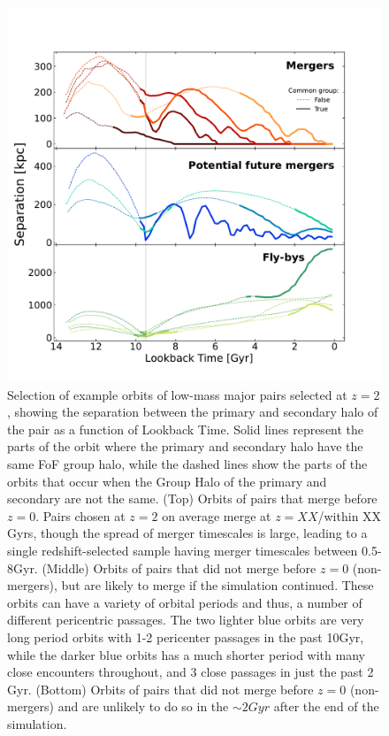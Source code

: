 \documentclass[twocolumn]{aastex631}
\begin{document}
\begin{figure}[htb]
    \centering
    \includegraphics[width=\textwidth]{plots/bet-on-it/exorbits_physical.pdf}
    \caption{Selection of example orbits of low-mass major pairs selected at $z=2$, showing the separation between the primary and secondary halo of the pair as a function of Lookback Time.
    Solid lines represent the parts of the orbit where the primary and secondary halo have the same FoF group halo, while the dashed lines show the parts of the orbits that occur when the Group Halo of the primary and secondary are not the same. 
    (Top) Orbits of pairs that merge before $z=0$. Pairs chosen at $z=2$ on average merge at $z=XX$/within XX Gyrs, though the spread of merger timescales is large, leading to a single redshift-selected sample having merger timescales between 0.5-8Gyr. 
    (Middle) Orbits of pairs that did not merge before $z=0$ (non-mergers), but are likely to merge if the simulation continued. These orbits can have a variety of orbital periods and thus, a number of different pericentric passages. The two lighter blue orbits are very long period orbits with 1-2 pericenter passages in the past 10Gyr, while the darker blue orbits has a much shorter period with many close encounters throughout, and 3 close passages in just the past 2 Gyr. 
    (Bottom) Orbits of pairs that did not merge before $z=0$ (non-mergers) and are unlikely to do so in the $\sim2Gyr$ after the end of the simulation. 
    }
    \label{fig:example-orbits}
\end{figure}
\end{document}
